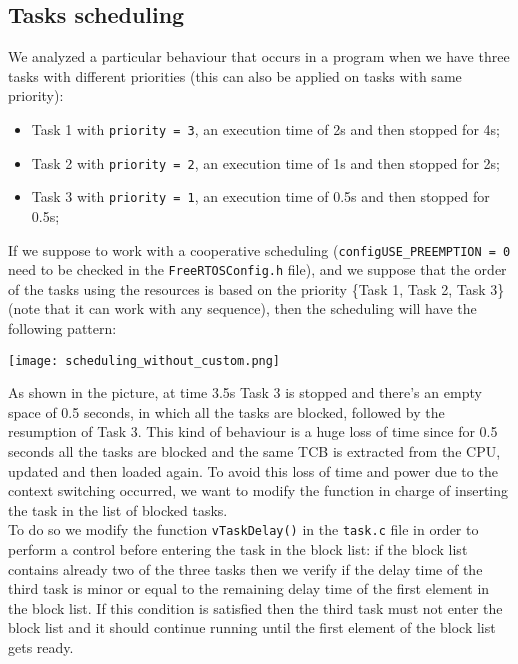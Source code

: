 \documentclass[a4paper,11pt]{report}
\begin{document}
\subsection{Tasks scheduling}
We analyzed a particular behaviour that occurs in a program when we have three tasks with different priorities (this can also be applied on tasks with same priority):
\begin{itemize}
    \item Task 1 with \texttt{priority = 3}, an execution time of 2s and then stopped for 4s;
    \item Task 2 with \texttt{priority = 2}, an execution time of 1s and then stopped for 2s;
    \item Task 3 with \texttt{priority = 1}, an execution time of 0.5s and then stopped for 0.5s;
\end{itemize}
If we suppose to work with a cooperative scheduling (\texttt{configUSE\_PREEMPTION = 0} need to be checked in the \texttt{FreeRTOSConfig.h} file), and we suppose that the order of the tasks using the resources is based on the priority \{Task 1, Task 2, Task 3\} (note that it can work with any sequence), then the scheduling will have the following pattern:
\begin{center}
  \texttt{[image: scheduling\_without\_custom.png]}
\end{center}
As shown in the picture, at time 3.5s Task 3 is stopped and there's an empty space of 0.5 seconds, in which all the tasks are blocked, followed by the resumption of Task 3. This kind of behaviour is a huge loss of time since for 0.5 seconds all the tasks are blocked and the same TCB is extracted from the CPU, updated and then loaded again. To avoid this loss of time and power due to the context switching occurred, we want to modify the function in charge of inserting the task in the list of blocked tasks.\\
To do so we modify the function \texttt{vTaskDelay()} in the \texttt{task.c} file in order to perform a control before entering the task in the block list: if the block list contains already two of the three tasks then we verify if the delay time of the third task is minor or equal to the remaining delay time of the first element in the block list. If this condition is satisfied then the third task must not enter the block list and it should continue running until the first element of the block list gets ready.
\end{document}
